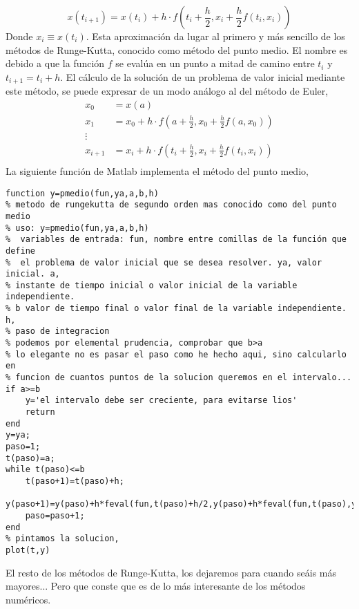 \begin{equation*}
x(t_{i+1})=x(t_i)+h\cdot f(t_i+\frac{h}{2},x_i+\frac{h}{2}f(t_i,x_i))
\end{equation*}
Donde $x_i\equiv x(t_i)$. Esta aproximación da lugar al primero y más sencillo de los métodos de Runge-Kutta, conocido como método del punto medio. El nombre es debido a que la función $f$ se evalúa en un punto a mitad de camino entre $t_i$ y $t_{i+1}=t_i+h$. El cálculo de la solución de un problema de valor inicial mediante este método, se puede expresar de un modo análogo al del método de Euler, 
\begin{align*}
x_0&=x(a)\\
x_1&=x_0+h\cdot f(a+\frac{h}{2},x_0+\frac{h}{2}f(a,x_0))\\
\vdots \\
x_{i+1}&=x_i+h\cdot f(t_i+\frac{h}{2},x_i+\frac{h}{2}f(t_i,x_i))\\
\end{align*}
La siguiente función de Matlab implementa el método del punto medio,

\begin{lstlisting}
function y=pmedio(fun,ya,a,b,h)
% metodo de rungekutta de segundo orden mas conocido como del punto medio
% uso: y=pmedio(fun,ya,a,b,h)
%  variables de entrada: fun, nombre entre comillas de la función que define
%  el problema de valor inicial que se desea resolver. ya, valor inicial. a,
% instante de tiempo inicial o valor inicial de la variable independiente.
% b valor de tiempo final o valor final de la variable independiente. h,
% paso de integracion
% podemos por elemental prudencia, comprobar que b>a
% lo elegante no es pasar el paso como he hecho aqui, sino calcularlo en
% funcion de cuantos puntos de la solucion queremos en el intervalo...
if a>=b
    y='el intervalo debe ser creciente, para evitarse lios'
    return
end
y=ya;
paso=1;
t(paso)=a;
while t(paso)<=b
    t(paso+1)=t(paso)+h;
    y(paso+1)=y(paso)+h*feval(fun,t(paso)+h/2,y(paso)+h*feval(fun,t(paso),y(paso))/2);
    paso=paso+1;
end
% pintamos la solucion,
plot(t,y)

\end{lstlisting}


El resto de los métodos de Runge-Kutta, los dejaremos para cuando seáis más mayores... Pero que conste que es de lo más interesante de los métodos numéricos.

